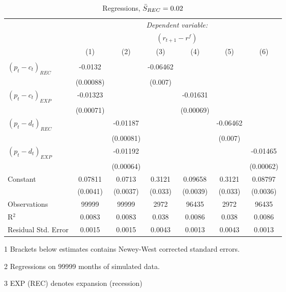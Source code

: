 \begin{table}[H]
\centering   
  \caption{Regressions, $\Bar{S}_{REC} = 0.02$}           
  \label{tab:regress2}     
  \begin{threeparttable}
\begin{tabular}{@{\hspace{5pt}}l@{\hspace{5pt}}cccccc} 
\toprule 
 & \multicolumn{6}{c}{\textit{Dependent variable:}} \\ 
 & \multicolumn{6}{c}{$\left(r_{t+1}-r^f\right)$} \\ 
 \cmidrule(rr){2-7}
 & (1) & (2) & (3) & (4) & (5) & (6) \\ 
\midrule  
\\[-2.1ex] $\left( p_t - c_t \right)_{REC}$ &-0.0132& &-0.06462 & & &\\ 
  & (0.00088) & &(0.007) & & & \\ 
 \addlinespace 
  $\left( p_t - c_t \right)_{EXP}$ &-0.01323  &    & &-0.01631 & &  \\ 
  & (0.00071) & & &(0.00069) & & \\ 
 \addlinespace 
  $\left( p_t - d_t \right)_{REC}$ & &-0.01187& & & -0.06462  &   \\ 
                                   & &  (0.00081) & & & (0.007) &    \\ 
 \addlinespace 
  $\left( p_t - d_t \right)_{EXP}$ & &   -0.01192& & & &-0.01465 \\ 
                                   & &  (0.00064) & & & &(0.00062) \\ 
 \addlinespace 
 Constant &0.07811 &0.0713&0.3121 &0.09658 &0.3121 &0.08797 \\ 
          &(0.0041) &(0.0037)&(0.033)&(0.0039)&(0.033)&(0.0036) \\ 
 \addlinespace 
\midrule  
Observations & 99999 & 99999&2972 & 96435&2972&96435\\
R$^{2}$ &0.0083 & 0.0083&0.038&0.0086&0.038&0.0086 \\ 
Residual Std. Error &0.0015 & 0.0015&0.0043&0.0013&0.0043&0.0013 \\ 
\bottomrule 
\end{tabular} 
\begin{tablenotes}
\footnotesize{
\item[1] Brackets below estimates contains Newey-West corrected standard errors. 
\item[2] Regressions on 99999 months of simulated data.
\item[3] EXP (REC) denotes expansion (recession)
}
\end{tablenotes}
\end{threeparttable}
\end{table} 
